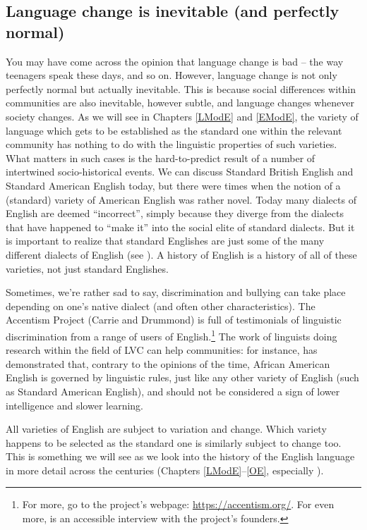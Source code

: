 \subsection{Language change is inevitable (and perfectly normal)}
You may have come across the opinion that language change is bad -- the way teenagers speak these days, and so on. However, language change is not only perfectly normal but actually inevitable. This is because social differences within communities are also inevitable, however subtle, and language changes whenever society changes. As we will see in Chapters \ref{LModE} and \ref{EModE}, the variety of language which gets to be established as the standard one within the relevant community has nothing to do with the linguistic properties of such varieties. What matters in such cases is the hard-to-predict result of a number of intertwined socio-historical events. We can discuss Standard British English and Standard American English today, but there were times when the notion of a (standard) variety of American English was rather novel. Today many dialects of English are deemed ``incorrect'', simply because they diverge from the dialects that have happened to ``make it'' into the social elite of standard dialects. But it is important to realize that standard Englishes are just some of the many different dialects of English (see \citealp{Trudgill1999}). A history of English is a history of all of these varieties, not just standard Englishes.

Sometimes, we're rather sad to say, discrimination and bullying can take place depending on one's native dialect (and often other characteristics). The Accentism Project (Carrie and Drummond) is full of testimonials of linguistic discrimination from a range of users of English.\footnote{For more, go to the project's webpage: \url{https://accentism.org/}. For even more, \citet{Paterson2019} is an accessible interview with the project's founders.} The work of linguists doing research within the field of LVC can help communities: for instance, \citet{Labov1966} has demonstrated that, contrary to the opinions of the time, African American English is governed by linguistic rules, just like any other variety of English (such as Standard American English), and should not be considered a sign of lower intelligence and slower learning.

All varieties of English are subject to variation and change. Which variety happens to be selected as the standard one is similarly subject to change too. This is something we will see as we look into the history of the English language in more detail across the centuries (Chapters \ref{LModE}--\ref{OE}, especially ).

